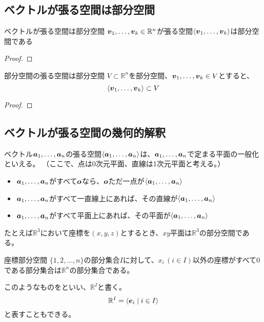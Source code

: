 \documentclass[../../../topic_linear-algebra]{subfiles}
\begin{document}
\subsection{ベクトルが張る空間は部分空間}

\begin{theorem}{ベクトルが張る空間は部分空間}
  $\vb*{v}_1,\dots, \vb*{v}_k \in \mathbb{R}^n$が張る空間$\langle \vb*{v}_1, \dots, \vb*{v}_k \rangle$は部分空間である
\end{theorem}

\begin{proof}
\end{proof}

\br

\begin{theorem}{部分空間の張る空間は部分空間}
  $V \subset \mathbb{R}^n$を部分空間、$\vb*{v}_1, \dots, \vb*{v}_k \in V$とすると、
  \begin{equation*}
    \langle \vb*{v}_1, \dots, \vb*{v}_k \rangle \subset V
  \end{equation*}
\end{theorem}

\begin{proof}
\end{proof}

\subsection{ベクトルが張る空間の幾何的解釈}

ベクトル$\vb*{a}_1, \ldots, \vb*{a}_n$の張る空間$\langle \vb*{a}_1, \ldots, \vb*{a}_n \rangle$は、$\vb*{a}_1, \ldots, \vb*{a}_n$で定まる平面の一般化といえる。
（ここで、点は0次元平面、直線は1次元平面と考える。）

\begin{itemize}
  \item $\vb*{a}_1, \ldots, \vb*{a}_n$がすべて$\vb*{o}$なら、$\vb*{o}$ただ一点が$\langle \vb*{a}_1, \ldots, \vb*{a}_n \rangle$
  \item $\vb*{a}_1, \ldots, \vb*{a}_n$がすべて一直線上にあれば、その直線が$\langle \vb*{a}_1, \ldots, \vb*{a}_n \rangle$
  \item $\vb*{a}_1, \ldots, \vb*{a}_n$がすべて平面上にあれば、その平面が$\langle \vb*{a}_1, \ldots, \vb*{a}_n \rangle$
\end{itemize}

\br

たとえば$\mathbb{R}^3$において座標を$(x, y, z)$とするとき、$xy$平面は$\mathbb{R}^3$の部分空間である。

\begin{definition}{座標部分空間}
  $\{1, 2, \dots, n\}$の部分集合$I$に対して、$x_i \, (i \in I)$以外の座標がすべて0である部分集合は$\mathbb{R}^n$の部分集合である。

  このようなものをといい、$\mathbb{R}^I$と書く。
  \begin{equation*}
    \mathbb{R}^I = \langle \vb*{e}_i \mid i \in I \rangle
  \end{equation*}
  と表すこともできる。
\end{definition}
\end{document}
